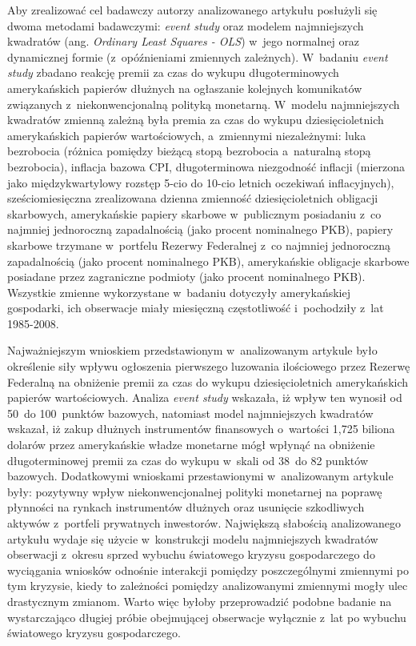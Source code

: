 Aby zrealizować cel badawczy autorzy analizowanego artykułu posłużyli się dwoma metodami badawczymi: \textit{event study} oraz modelem najmniejszych kwadratów (ang. \textit{Ordinary Least Squares - OLS}) w~jego normalnej oraz dynamicznej formie (z~opóźnieniami zmiennych zależnych). W~badaniu \textit{event study} zbadano reakcję premii za czas do wykupu długoterminowych amerykańskich papierów dłużnych na ogłaszanie kolejnych komunikatów związanych z~niekonwencjonalną polityką monetarną. W~modelu najmniejszych kwadratów zmienną zależną była premia za czas do wykupu dziesięcioletnich amerykańskich papierów wartościowych, a~zmiennymi niezależnymi: luka bezrobocia (różnica pomiędzy bieżącą stopą bezrobocia a~naturalną stopą bezrobocia), inflacja bazowa \acs{CPI}, długoterminowa niezgodność inflacji (mierzona jako międzykwartylowy rozstęp 5-cio do 10-cio letnich oczekiwań inflacyjnych), sześciomiesięczna zrealizowana dzienna zmienność dziesięcioletnich obligacji skarbowych, amerykańskie papiery skarbowe w~publicznym posiadaniu z~co najmniej jednoroczną zapadalnością (jako procent nominalnego \acs{PKB}), papiery skarbowe trzymane w~portfelu Rezerwy Federalnej z~co najmniej jednoroczną zapadalnością (jako procent nominalnego \acs{PKB}), amerykańskie obligacje skarbowe posiadane przez zagraniczne podmioty (jako procent nominalnego \acs{PKB}). Wszystkie zmienne wykorzystane w~badaniu dotyczyły amerykańskiej gospodarki, ich obserwacje miały miesięczną częstotliwość i~pochodziły z~lat 1985-2008.

Najważniejszym wnioskiem przedstawionym w~analizowanym artykule było określenie siły wpływu ogłoszenia pierwszego luzowania ilościowego przez Rezerwę Federalną na obniżenie premii za czas do wykupu dziesięcioletnich amerykańskich papierów wartościowych. Analiza \textit{event study} wskazała, iż wpływ ten wynosił od 50~do 100~punktów bazowych, natomiast model najmniejszych kwadratów wskazał, iż zakup dłużnych instrumentów finansowych o~wartości 1,725 biliona dolarów przez amerykańskie władze monetarne mógł wpłynąć na obniżenie długoterminowej premii za czas do wykupu w~skali od 38~do 82 punktów bazowych. Dodatkowymi wnioskami przestawionymi w~analizowanym artykule były: pozytywny wpływ niekonwencjonalnej polityki monetarnej na poprawę płynności na rynkach instrumentów dłużnych oraz usunięcie szkodliwych aktywów z~portfeli prywatnych inwestorów. Największą słabością analizowanego artykułu wydaje się użycie w~konstrukcji modelu najmniejszych kwadratów obserwacji z~okresu sprzed wybuchu światowego kryzysu gospodarczego do wyciągania wniosków odnośnie interakcji pomiędzy poszczególnymi zmiennymi po tym kryzysie, kiedy to zależności pomiędzy analizowanymi zmiennymi mogły ulec drastycznym zmianom. Warto więc byłoby przeprowadzić podobne badanie na wystarczająco długiej próbie obejmującej obserwacje wyłącznie z~lat po wybuchu światowego kryzysu gospodarczego.

